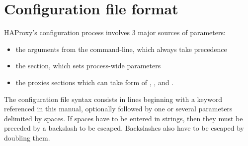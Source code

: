 
\section{Configuration file format}

HAProxy's configuration process involves 3 major sources of parameters:

\begin{itemize}
\item the arguments from the command-line, which always take precedence
\item the  section, which sets process-wide parameters
\item the proxies sections which can take form of , 
	,  and .
\end{itemize}

The configuration file syntax consists in lines beginning with a keyword
referenced in this manual, optionally followed by one or several parameters
delimited by spaces. If spaces have to be entered in strings, then they must be
preceded by a backslash \CHAR{\bslash} to be escaped. Backslashes also have to be
escaped by doubling them.

